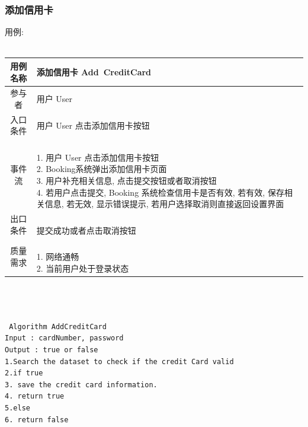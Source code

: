 \documentclass[11pt]{article}
\begin{document}
		\subsubsection{添加信用卡}
			用例: \\ \\
			\begin{tabular}{c|l}
			\hline
			用例名称 & 添加信用卡 Add\ CreditCard \\ \hline
			参与者 & 用户 User  \\ \hline
			入口条件 & 用户 User 点击添加信用卡按钮 \\ \hline
			事件流 & 	\parbox{33em}{\ \\
						1. 用户 User 点击添加信用卡按钮 \\
						2. Booking系统弹出添加信用卡页面 \\
						3. 用户补充相关信息, 点击提交按钮或者取消按钮  \\
						4. 若用户点击提交, Booking 系统检查信用卡是否有效, 若有效, 保存相关信息, 若无效, 显示错误提示, 若用户选择取消则直接返回设置界面 \\
						} \\ \hline
			出口条件 & \parbox{33em}{\ \\
						提交成功或者点击取消按钮 \\
						} \\ \hline
			质量需求 & \parbox{33em}{\ \\
						1. 网络通畅 \\
						2. 当前用户处于登录状态 \\
						} \\ \hline
			\end{tabular} \\ \\ \\
			\texttt{
			Algorithm AddCreditCard \\
			Input : cardNumber, password \\
			Output : true or false \\
			1.Search the dataset to check if the credit Card valid \\
			2.if true \\
			3.  save the credit card information. \\
			4.	return true \\
			5.else \\
			6.  return false \\
			} \\
			
\end{document}
